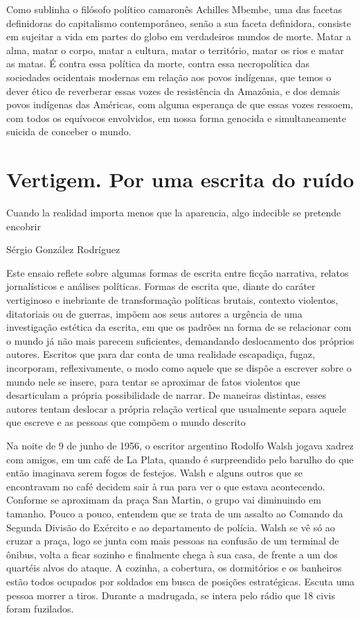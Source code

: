 Como sublinha o filósofo político camaronês Achilles Mbembe, uma das
facetas definidoras do capitalismo contemporâneo, senão a sua faceta
definidora, consiste em sujeitar a vida em partes do globo em
verdadeiros mundos de morte. Matar a alma, matar o corpo, matar a
cultura, matar o território, matar os rios e matar as matas. É contra
essa política da morte, contra essa necropolítica das sociedades
ocidentais modernas em relação aos povos indígenas, que temos o dever
ético de reverberar essas vozes de resistência da Amazônia, e dos demais
povos indígenas das Américas, com alguma esperança de que essas vozes
ressoem, com todos os equívocos envolvidos, em nossa forma genocida e
simultaneamente suicida de conceber o mundo.

\chapter{Vertigem. Por uma escrita do ruído}

\epigraph{Cuando la realidad importa menos que la aparencia, algo indecible
se pretende encobrir}{Sérgio González Rodríguez}

Este ensaio reflete sobre algumas formas de escrita entre ficção
narrativa, relatos jornalísticos e análises políticas. Formas de escrita
que, diante do caráter vertiginoso e inebriante de transformação
políticas brutais, contexto violentos, ditatoriais ou de guerras, impõem
aos seus autores a urgência de uma investigação estética da escrita, em
que os padrões na forma de se relacionar com o mundo já não mais parecem
suficientes, demandando deslocamento dos próprios autores. Escritos que
para dar conta de uma realidade escapadiça, fugaz, incorporam,
reflexivamente, o modo como aquele que se dispõe a escrever sobre o
mundo nele se insere, para tentar se aproximar de fatos violentos que
desarticulam a própria possibilidade de narrar. De maneiras distintas,
esses autores tentam deslocar a própria relação vertical que usualmente
separa aquele que escreve e as pessoas que compõem o mundo descrito

\asterisc

Na noite de 9 de junho de 1956, o escritor argentino Rodolfo Walsh
jogava xadrez com amigos, em um café de La Plata, quando é surpreendido
pelo barulho do que então imaginava serem fogos de festejos. Walsh e
alguns outros que se encontravam no café decidem sair à rua para ver o
que estava acontecendo. Conforme se aproximam da praça San Martin, o
grupo vai diminuindo em tamanho. Pouco a pouco, entendem que se trata de
um assalto ao Comando da Segunda Divisão do Exército e ao departamento
de polícia. Walsh se vê só ao cruzar a praça, logo se junta com mais
pessoas na confusão de um terminal de ônibus, volta a ficar sozinho e
finalmente chega à sua casa, de frente a um dos quartéis alvos do
ataque. A cozinha, a cobertura, os dormitórios e os banheiros estão
todos ocupados por soldados em busca de posições estratégicas. Escuta
uma pessoa morrer a tiros. Durante a madrugada, se intera pelo rádio que
18 civis foram fuzilados.

